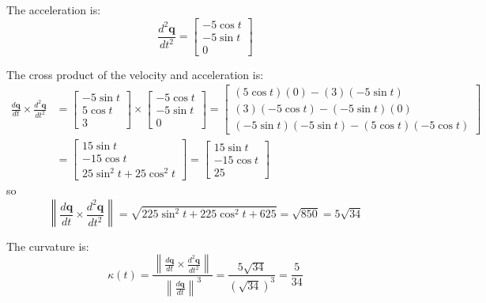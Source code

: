 \documentclass{article}
\begin{document}
The acceleration is:
\[\frac{d^2 \mathbf{q}}{dt^2} = \begin{bmatrix} -5 \cos t \\ -5 \sin t \\ 0 \end{bmatrix}\]

The cross product of the velocity and acceleration is:
\begin{align*}
\frac{d\mathbf{q}}{dt} \times \frac{d^2 \mathbf{q}}{dt^2} 
& = \begin{bmatrix} -5 \sin t \\ 5 \cos t \\ 3 \end{bmatrix} \times \begin{bmatrix} -5 \cos t \\ -5 \sin t \\ 0 \end{bmatrix}
= \begin{bmatrix} (5\cos t)(0) - (3)(-5\sin t) \\ (3)(-5\cos t) - (-5\sin t)(0) \\ (-5\sin t)(-5\sin t) - (5\cos t)(-5\cos t) \end{bmatrix} \\ 
& = \begin{bmatrix} 15\sin t \\ -15\cos t \\ 25\sin^2 t + 25\cos^2 t \end{bmatrix} 
= \begin{bmatrix} 15\sin t \\ -15\cos t \\ 25 \end{bmatrix}
\end{align*}
so
\[\left\|\frac{d\mathbf{q}}{dt} \times \frac{d^2 \mathbf{q}}{dt^2}\right\| = \sqrt{225\sin^2 t + 225\cos^2 t + 625} = \sqrt{850} = 5\sqrt{34}\]

The curvature is: 
\[\kappa(t) = \frac{\left\|\frac{d\mathbf{q}}{dt} \times \frac{d^2 \mathbf{q}}{dt^2}\right\|}{\left\|\frac{d\mathbf{q}}{dt}\right\|^3} = \frac{5\sqrt{34}}{(\sqrt{34})^3} = \frac{5}{34}\]
\end{document}
